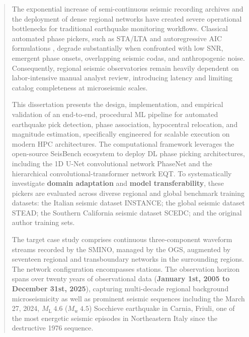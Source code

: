 
\begin{abstract}
  The exponential increase of semi-continuous seismic recording archives and
  the deployment of dense regional networks have created severe operational
  bottlenecks for traditional earthquake monitoring workflows. Classical
  automated phase pickers, such as \ac{STA/LTA} and autoregressive \ac{AIC}
  formulations , degrade substantially
  when confronted with low \ac{SNR}, emergent phase onsets, overlapping seismic
  codas, and anthropogenic noise. Consequently, regional seismic observatories
  remain heavily dependent on labor-intensive manual analyst review,
  introducing latency and limiting catalog completeness at microseismic scales.

  This dissertation presents the design, implementation, and empirical
  validation of an end-to-end, procedural \ac{ML} pipeline for automated
  earthquake pick detection, phase association, hypocentral relocation, and
  magnitude estimation, specifically engineered for scalable execution on
  modern \ac{HPC} architectures. The computational framework leverages the
  open-source SeisBench \parencite{SeisBench} ecosystem to deploy \ac{DL} phase
  picking architectures, including the 1D U-Net convolutional network
  \ac{PhaseNet} and the hierarchical convolutional-transformer network
  \ac{EQT}. To systematically investigate \textbf{domain adaptation} and
  \textbf{model transferability}, these pickers are evaluated across diverse
  regional and global benchmark training datasets: the Italian seismic dataset
  \ac{INSTANCE}; the global seismic dataset \ac{STEAD}; the Southern California
  seismic dataset \ac{SCEDC}; and the original author training sets.

  The target case study comprises continuous three-component waveform streams
  recorded by the \acf{SMINO}, managed by the \acf{OGS}, augmented by seventeen
  regional and transboundary networks in the surrounding regions. The network
  configuration encompasses  stations. The
  observation horizon spans over twenty years of observational data
  (\textbf{January 1st, 2005 to December 31st, 2025}), capturing multi-decade
  regional background microseismicity as well as prominent seismic sequences
  including the March 27, 2024, $M_{\mathrm{L}}~\num{4.6}$
  ($M_{\mathrm{w}}~\num{4.5}$) Socchieve earthquake in Carnia, Friuli, one of
  the most energetic seismic episodes in Northeastern Italy since the
  destructive 1976 sequence.


\end{abstract}
